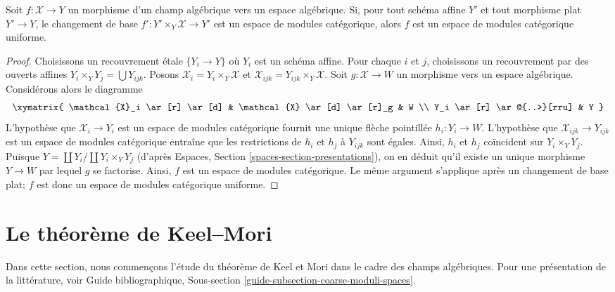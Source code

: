 \begin{lemma}
\label{lemma-check-uniform-categorical-quotient-on-affines}
Soit $f : \mathcal{X} \to Y$ un morphisme d'un champ algébrique
vers un espace algébrique. Si, pour tout schéma affine $Y'$ et tout
morphisme plat $Y' \to Y$, le changement de base
$f' : Y' \times_Y \mathcal{X} \to Y'$ est un espace de modules catégorique,
alors $f$ est un espace de modules catégorique uniforme.
\end{lemma}

\begin{proof}
Choisissons un recouvrement \'etale $\{Y_i \to Y\}$ où $Y_i$ est un schéma affine.
Pour chaque $i$ et $j$, choisissons un recouvrement par des ouverts affines
$Y_i \times_Y Y_j = \bigcup Y_{ijk}$.
Posons $\mathcal{X}_i = Y_i \times_Y \mathcal{X}$ et
$\mathcal{X}_{ijk} = Y_{ijk} \times_Y \mathcal{X}$.
Soit $g : \mathcal{X} \to W$ un morphisme vers
un espace algébrique. Considérons alors le diagramme
$$
\xymatrix{
\mathcal{X}_i \ar[r] \ar[d] & \mathcal{X} \ar[d] \ar[r]_g & W \\
Y_i \ar[r] \ar@{..>}[rru] & Y
}
$$
L'hypothèse que $\mathcal{X}_i \to Y_i$ est un espace de modules
catégorique fournit une unique flèche pointillée $h_i : Y_i \to W$.
L'hypothèse que $\mathcal{X}_{ijk} \to Y_{ijk}$ est un espace de modules
catégorique entraîne que les restrictions de $h_i$ et $h_j$ à
$Y_{ijk}$ sont égales. Ainsi, $h_i$ et $h_j$ coïncident sur $Y_i \times_Y Y_j$.
Puisque $Y = \coprod Y_i / \coprod Y_i \times_Y Y_j$
(d'après Espaces, Section \ref{spaces-section-presentations}), on en déduit
qu'il existe un unique morphisme $Y \to W$ par lequel $g$ se factorise.
Ainsi, $f$ est un espace de modules catégorique. Le même argument s'applique
après un changement de base plat; $f$ est donc un espace de modules catégorique uniforme.
\end{proof}







\section{Le théorème de Keel--Mori}
\label{section-Keel-Mori}

\noindent
Dans cette section, nous commençons l'étude du théorème de Keel et Mori
dans le cadre des champs algébriques. Pour une présentation de la
littérature, voir Guide bibliographique, Sous-section
\ref{guide-subsection-coarse-moduli-spaces}.

